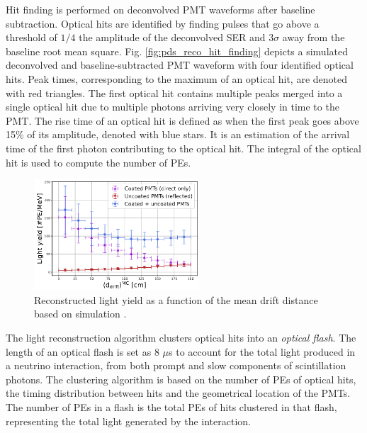 Hit finding is performed on deconvolved PMT waveforms after baseline subtraction.
Optical hits are identified by finding pulses that go above a threshold of $1/4$ the amplitude of the deconvolved SER and 3$\sigma$ away from the baseline root mean square.
Fig. \ref{fig:pds_reco_hit_finding} depicts a simulated deconvolved and baseline-subtracted PMT waveform with four identified optical hits.
Peak times, corresponding to the maximum of an optical hit, are denoted with red triangles.
The first optical hit contains multiple peaks merged into a single optical hit due to multiple photons arriving very closely in time to the PMT.
The rise time of an optical hit is defined as when the first peak goes above 15\% of its amplitude, denoted with blue stars.
It is an estimation of the arrival time of the first photon contributing to the optical hit. 
The integral of the optical hit is used to compute the number of PEs.

\begin{figure}[b!]
\centering    
\includegraphics[width=0.55\textwidth]{light_yield_sim}
\caption[Reconstructed Light Yield at SBND]{
Reconstructed light yield as a function of the mean drift distance based on simulation \cite{sbnd_pds_paper}. 
}
\label{fig:light_yield_Diego}
\end{figure}

The light reconstruction algorithm clusters optical hits into an \textit{optical flash}.
The length of an optical flash is set as 8 $\mu$s to account for the total light produced in a neutrino interaction, from both prompt and slow components of scintillation photons.
The clustering algorithm is based on the number of PEs of optical hits, the timing distribution between hits and the geometrical location of the PMTs.
The number of PEs in a flash is the total PEs of hits clustered in that flash, representing the total light generated by the interaction. 

